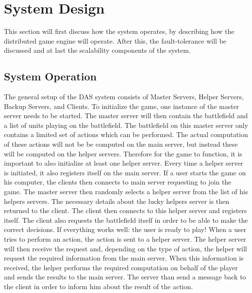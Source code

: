 \section{System Design}
This section will first discuss how the system operates, by describing how the distributed game engine will operate.
After this, the fault-tolerance will be discussed and at last the scalability components of the system.

\subsection{System Operation}
The general setup of the DAS system consists of Master Servers, Helper Servers, Backup Servers, and Clients.
To initialize the game, one instance of the master server needs to be started. 
The master server will then contain the battlefield and a list of units playing on the battlefield.
The battlefield on this master server only contains a limited set of actions which can be performed.
The actual computation of these actions will not be be computed on the main server, but instead these will be computed on the helper servers.
Therefore for the game to function, it is important to also initialize at least one helper server. 
Every time a helper server is initiated, it also registers itself on the main server.
If a user starts the game on his computer, the clients then connects to main server requesting to join the game.
The master server then randomly selects a helper server from the list of his helpers servers.
The necessary details about the lucky helpers server is then returned to the client. 
The client then connects to this helper server and registers itself.
The client also requests the battlefield itself in order to be able to make the correct decisions. 
If everything works well: the user is ready to play!
When a user tries to perform an action, the action is sent to a helper server.
The helper server will then receive the request and, depending on the type of action, the helper will request the required information from the main server.
When this information is received, the helper performs the required computation on behalf of the player and sends the results to the main server.
The server than send a message back to the client in order to inform him about the result of the action.

